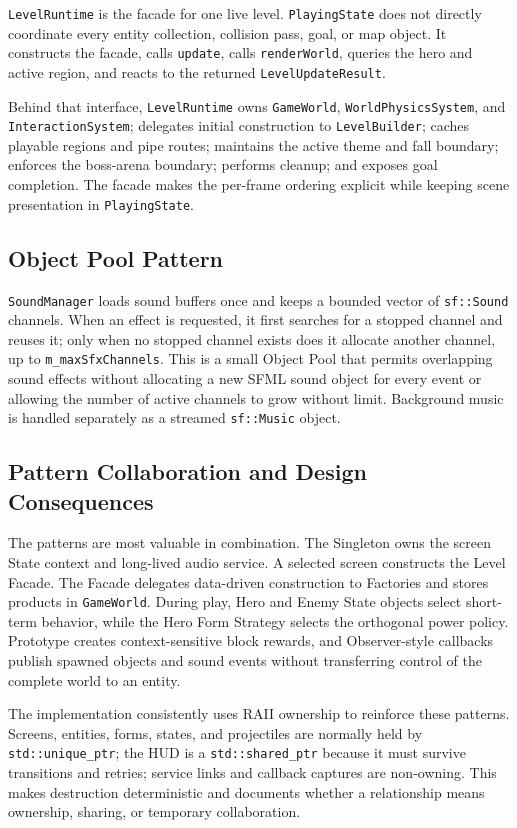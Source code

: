 \texttt{LevelRuntime} is the facade for one live level.  \texttt{PlayingState}
does not directly coordinate every entity collection, collision pass, goal, or
map object.  It constructs the facade, calls \texttt{update}, calls
\texttt{renderWorld}, queries the hero and active region, and reacts to the
returned \texttt{LevelUpdateResult}.

Behind that interface, \texttt{LevelRuntime} owns \texttt{GameWorld},
\texttt{WorldPhysicsSystem}, and \texttt{InteractionSystem}; delegates initial
construction to \texttt{LevelBuilder}; caches playable regions and pipe routes;
maintains the active theme and fall boundary; enforces the boss-arena boundary;
performs cleanup; and exposes goal completion.  The facade makes the per-frame
ordering explicit while keeping scene presentation in \texttt{PlayingState}.

\subsection{Object Pool Pattern}
\label{subsec:object-pool-pattern}

\texttt{SoundManager} loads sound buffers once and keeps a bounded vector of
\texttt{sf::Sound} channels.  When an effect is requested, it first searches
for a stopped channel and reuses it; only when no stopped channel exists does it
allocate another channel, up to \texttt{m\_maxSfxChannels}.  This is a small
Object Pool that permits overlapping sound effects without allocating a new
SFML sound object for every event or allowing the number of active channels to
grow without limit.  Background music is handled separately as a streamed
\texttt{sf::Music} object.

\subsection{Pattern Collaboration and Design Consequences}
\label{subsec:pattern-collaboration}

The patterns are most valuable in combination.  The Singleton owns the screen
State context and long-lived audio service.  A selected screen constructs the
Level Facade.  The Facade delegates data-driven construction to Factories and
stores products in \texttt{GameWorld}.  During play, Hero and Enemy State
objects select short-term behavior, while the Hero Form Strategy selects the
orthogonal power policy.  Prototype creates context-sensitive block rewards,
and Observer-style callbacks publish spawned objects and sound events without
transferring control of the complete world to an entity.

The implementation consistently uses RAII ownership to reinforce these
patterns.  Screens, entities, forms, states, and projectiles are normally held
by \texttt{std::unique\_ptr}; the HUD is a \texttt{std::shared\_ptr} because it
must survive transitions and retries; service links and callback captures are
non-owning.  This makes destruction deterministic and documents whether a
relationship means ownership, sharing, or temporary collaboration.
\par
\endgroup
